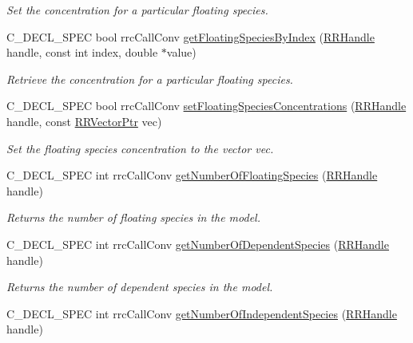 \begin{DoxyCompactItemize}
\begin{DoxyCompactList}\small\item\em Set the concentration for a particular floating species. \end{DoxyCompactList}\item 
C\+\_\+\+D\+E\+C\+L\+\_\+\+S\+P\+E\+C bool rrc\+Call\+Conv \hyperlink{group__floating_gaa5ab4c688801aa88c60bea9c745a8d7d}{get\+Floating\+Species\+By\+Index} (\hyperlink{rrc__types_8h_a1d68f0592372208fa5a5f2799ea4b3ae}{R\+R\+Handle} handle, const int index, double $\ast$value)
\begin{DoxyCompactList}\small\item\em Retrieve the concentration for a particular floating species. \end{DoxyCompactList}\item 
C\+\_\+\+D\+E\+C\+L\+\_\+\+S\+P\+E\+C bool rrc\+Call\+Conv \hyperlink{group__floating_gab6bde54c81fa570ab09da91b65e92327}{set\+Floating\+Species\+Concentrations} (\hyperlink{rrc__types_8h_a1d68f0592372208fa5a5f2799ea4b3ae}{R\+R\+Handle} handle, const \hyperlink{rrc__types_8h_a3be72d6006034fd349f753d2bf441bf7}{R\+R\+Vector\+Ptr} vec)
\begin{DoxyCompactList}\small\item\em Set the floating species concentration to the vector vec. \end{DoxyCompactList}\item 
C\+\_\+\+D\+E\+C\+L\+\_\+\+S\+P\+E\+C int rrc\+Call\+Conv \hyperlink{group__floating_gab520e3bf495d490a96c5ee19870e7691}{get\+Number\+Of\+Floating\+Species} (\hyperlink{rrc__types_8h_a1d68f0592372208fa5a5f2799ea4b3ae}{R\+R\+Handle} handle)
\begin{DoxyCompactList}\small\item\em Returns the number of floating species in the model. \end{DoxyCompactList}\item 
C\+\_\+\+D\+E\+C\+L\+\_\+\+S\+P\+E\+C int rrc\+Call\+Conv \hyperlink{group__floating_ga284f3c15160144a2639f1d3379f7766b}{get\+Number\+Of\+Dependent\+Species} (\hyperlink{rrc__types_8h_a1d68f0592372208fa5a5f2799ea4b3ae}{R\+R\+Handle} handle)
\begin{DoxyCompactList}\small\item\em Returns the number of dependent species in the model. \end{DoxyCompactList}\item 
C\+\_\+\+D\+E\+C\+L\+\_\+\+S\+P\+E\+C int rrc\+Call\+Conv \hyperlink{group__floating_gaf41fdcb9fb98b278742bb5269a317741}{get\+Number\+Of\+Independent\+Species} (\hyperlink{rrc__types_8h_a1d68f0592372208fa5a5f2799ea4b3ae}{R\+R\+Handle} handle)

\end{DoxyCompactItemize}
